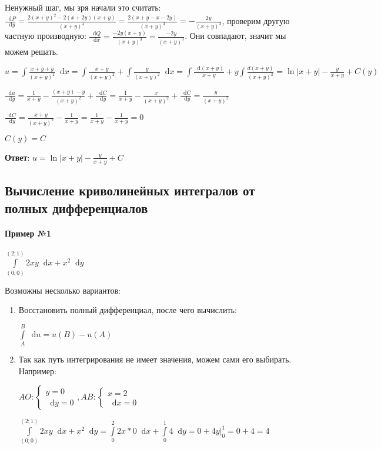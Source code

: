 \documentclass{article}
\newcommand*\diff{\mathop{}\!\mathrm{d}}
\begin{document}
Ненужный шаг, мы зря начали это считать: $\frac{\diff P}{\diff y} = \frac{2(x + y)^2 - 2(x + 2y)(x + y)}{(x + y)^4} = \frac{2(x + y - x - 2y)}{(x+y)^3} = -\frac{2y}{(x + y)^3}$, проверим другую частную производную: $\frac{\diff Q}{\diff x} = \frac{-2y(x + y)}{(x+y)^3} = \frac{-2y}{(x+y)^3}$. Они совпадают, значит мы можем решать.

$u = \int \frac{x + y + y}{(x+y)^2} \diff x = \int \frac{x + y}{(x + y)^2} + \int \frac{y}{(x + y)^2} \diff x = \int \frac{\diff (x + y)}{x + y} + y \int \frac{d(x + y)}{(x + y)^2} = \ln |x + y| - \frac{y}{x + y} + C(y)$

$\frac{\diff u}{\diff y} = \frac{1}{x + y} - \frac{(x + y) - y}{(x + y)^2} + \frac{\diff C}{\diff y} = \frac{1}{x + y} - \frac{x}{(x + y)^2} + \frac{\diff C}{\diff y} = \frac{y}{(x + y)^2}$

$\frac{\diff C}{\diff y} = \frac{x + y}{(x + y)^2} - \frac{1}{x + y} = \frac{1}{x + y} - \frac{1}{x + y} = 0$

$C(y) = C$

\textbf{Ответ}: $u = \ln |x + y| - \frac{y}{x + y} + C$

\subsection{Вычисление криволинейных интегралов от полных дифференциалов}

\paragraph{Пример №1} $\int\limits_{(0; 0)}^{(2; 1)} 2 xy \diff x + x^2 \diff y$

Возможны несколько вариантов:

\begin{enumerate}
    \item Восстановить полный дифференциал, после чего вычислить:
    
    $\int\limits_{A}^{B} \diff u = u(B) - u(A)$
    \item Так как путь интегрирования не имеет значения, можем сами его выбирать. Например:
    
    $AO: \begin{cases}
        y = 0 \\
        \diff y = 0
    \end{cases}, AB: \begin{cases}
        x = 2 \\
        \diff x = 0
    \end{cases}$

    $\int\limits_{(0; 0)}^{(2; 1)} 2 xy \diff x + x^2 \diff y = \int\limits_{0}^{2} 2x * 0 \diff x + \int\limits_{0}^{1} 4 \diff y = 0 + 4y \bigg|_{0}^{1} = 0 + 4 = 4$
\end{enumerate}
\end{document}
